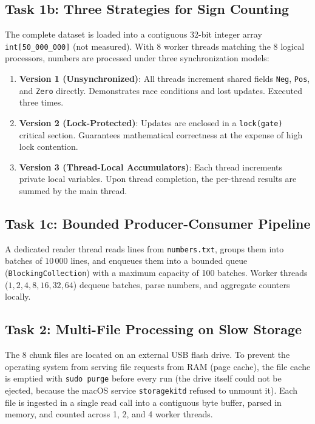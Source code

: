 \documentclass[11pt,a4paper]{article}
\begin{document}
\subsection{Task 1b: Three Strategies for Sign Counting}
The complete dataset is loaded into a contiguous 32-bit integer array \texttt{int[50\_000\_000]} (not measured). With 8 worker threads matching the 8 logical processors, numbers are processed under three synchronization models:
\begin{enumerate}
    \item \textbf{Version 1 (Unsynchronized)}: All threads increment shared fields \texttt{Neg}, \texttt{Pos}, and \texttt{Zero} directly. Demonstrates race conditions and lost updates. Executed three times.
    \item \textbf{Version 2 (Lock-Protected)}: Updates are enclosed in a \texttt{lock(gate)} critical section. Guarantees mathematical correctness at the expense of high lock contention.
    \item \textbf{Version 3 (Thread-Local Accumulators)}: Each thread increments private local variables. Upon thread completion, the per-thread results are summed by the main thread.
\end{enumerate}

\subsection{Task 1c: Bounded Producer-Consumer Pipeline}
A dedicated reader thread reads lines from \texttt{numbers.txt}, groups them into batches of $10\,000$ lines, and enqueues them into a bounded queue (\texttt{BlockingCollection}) with a maximum capacity of 100 batches. Worker threads ($1, 2, 4, 8, 16, 32, 64$) dequeue batches, parse numbers, and aggregate counters locally.

\subsection{Task 2: Multi-File Processing on Slow Storage}
The 8 chunk files are located on an external USB flash drive. To prevent the operating system from serving file requests from RAM (page cache), the file cache is emptied with \texttt{sudo purge} before every run (the drive itself could not be ejected, because the macOS service \texttt{storagekitd} refused to unmount it). Each file is ingested in a single read call into a contiguous byte buffer, parsed in memory, and counted across 1, 2, and 4 worker threads.
\end{document}
